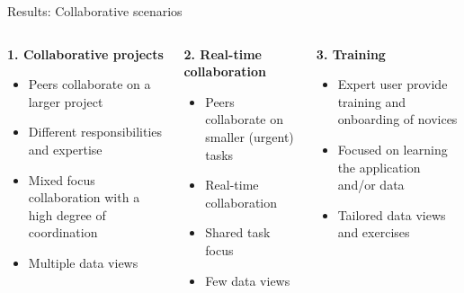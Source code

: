 \documentclass[aspectratio=169]{beamer}
\begin{document}
\begin{frame}{Results: Collaborative scenarios}
    \setlength{\leftmargini}{0.5cm}
    \begin{columns}[t]
        \begin{column}{0.33\textwidth}
            \textbf{\small 1. Collaborative projects}
            \begin{itemize}
                \scriptsize
                \item Peers collaborate on a larger project
                \item Different responsibilities and expertise
                \item Mixed focus collaboration with a high degree of coordination
                \item Multiple data views
            \end{itemize}
        \end{column}
        \begin{column}{0.33\textwidth}
            \textbf{\small 2. Real-time collaboration}
            \begin{itemize}
                \scriptsize
                \item Peers collaborate on smaller (urgent) tasks
                \item Real-time collaboration
                \item Shared task focus 
                \item Few data views
            \end{itemize}
        \end{column}
        \begin{column}{0.33\textwidth}
            \textbf{\small 3. Training}
            \begin{itemize}
                \scriptsize
                \item Expert user provide training and onboarding of novices
                \item Focused on learning the application and/or data
                \item Tailored data views and exercises
            \end{itemize}
        \end{column}
    \end{columns}
\end{frame}
\end{document}
